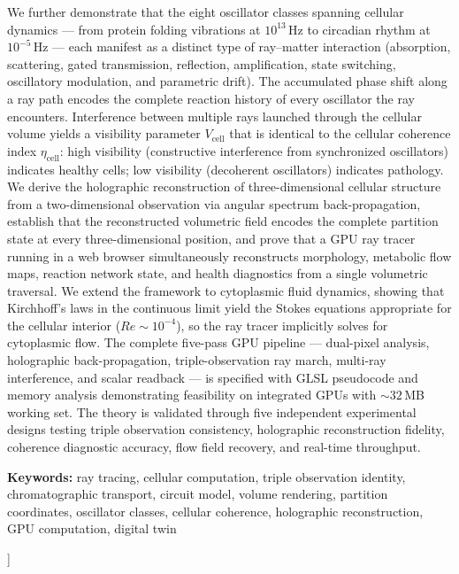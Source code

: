 \documentclass[11pt,twocolumn,a4paper]{article}
\newcommand{\etacell}{\eta_{\mathrm{cell}}}
\newcommand{\Vcell}{V_{\mathrm{cell}}}
\begin{document}
\begin{@twocolumnfalse}
\begin{center}
\begin{minipage}{0.92\textwidth}
We further demonstrate that the eight oscillator classes spanning
cellular dynamics --- from protein folding vibrations at $10^{13}$\,Hz
to circadian rhythm at $10^{-5}$\,Hz --- each manifest as a distinct
type of ray--matter interaction (absorption, scattering, gated
transmission, reflection, amplification, state switching, oscillatory
modulation, and parametric drift). The accumulated phase shift along a
ray path encodes the complete reaction history of every oscillator the
ray encounters. Interference between multiple rays launched through the
cellular volume yields a visibility parameter $\Vcell$ that is
identical to the cellular coherence index $\etacell$: high visibility
(constructive interference from synchronized oscillators) indicates
healthy cells; low visibility (decoherent oscillators) indicates
pathology. We derive the holographic reconstruction of
three-dimensional cellular structure from a two-dimensional observation
via angular spectrum back-propagation, establish that the
reconstructed volumetric field encodes the complete partition state at
every three-dimensional position, and prove that a GPU ray tracer
running in a web browser simultaneously reconstructs morphology,
metabolic flow maps, reaction network state, and health diagnostics
from a single volumetric traversal. We extend the framework to
cytoplasmic fluid dynamics, showing that Kirchhoff's laws in the
continuous limit yield the Stokes equations appropriate for the
cellular interior ($Re \sim 10^{-4}$), so the ray tracer implicitly
solves for cytoplasmic flow. The complete five-pass GPU pipeline ---
dual-pixel analysis, holographic back-propagation, triple-observation
ray march, multi-ray interference, and scalar readback --- is specified
with GLSL pseudocode and memory analysis demonstrating feasibility on
integrated GPUs with $\sim\!32$\,MB working set. The theory is
validated through five independent experimental designs testing triple
observation consistency, holographic reconstruction fidelity, coherence
diagnostic accuracy, flow field recovery, and real-time throughput.

\vspace{8pt}
\noindent\textbf{Keywords:} ray tracing, cellular computation, triple
observation identity, chromatographic transport, circuit model, volume
rendering, partition coordinates, oscillator classes, cellular
coherence, holographic reconstruction, GPU computation, digital twin
\end{minipage}

\vspace{18pt}
\end{center}
\end{@twocolumnfalse}
]
\end{document}
